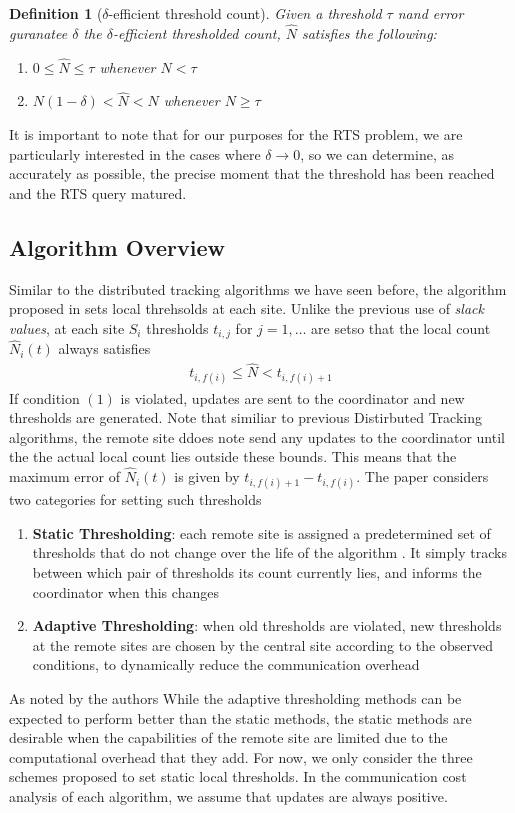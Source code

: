 \documentclass{article}
\newtheorem{definition}{Definition}
\begin{document}
\begin{definition}[$\delta$-efficient threshold count]
Given a threshold $\tau$ nand error guranatee $\delta$ the $\delta$-efficient thresholded count, $\hat{N}$ satisfies the following: 
\begin{enumerate}
    \item $0\leq \hat{N}\leq \tau$ whenever $N < \tau$
    \item $N(1-\delta) < \hat{N} < N$ whenever $N \geq \tau$
\end{enumerate}
\end{definition}
It is important to note that for our purposes for the RTS problem, we are particularly interested in the cases where $\delta\rightarrow0$, so we can determine, as accurately as possible, the precise moment that the threshold has been reached and the RTS query matured.

\subsection*{Algorithm Overview}
Similar to the distributed tracking algorithms we have seen before, the algorithm proposed in \cite{10.1145/1142473.1142507} sets local threhsolds at each site. Unlike the previous use of \textit{slack values}, at each site $S_i$ thresholds $t_{i,j}$ for $j=1,\dots$ are setso that the local count $\hat{N}_i(t)$ always satisfies
\begin{align}
    t_{i,f(i)} \leq \hat{N} < t_{i,f(i)+1}
\end{align}
If condition $(1)$ is violated, updates are sent to the coordinator and new thresholds are generated. Note that similiar to previous Distirbuted Tracking algorithms, the remote site ddoes note send any updates to the coordinator until the the actual local count lies outside these bounds. This means that the maximum error of $\hat{N}_i(t)$ is given by $t_{i,f(i)+1} - t_{i,f(i)}$. The paper considers two categories for setting such thresholds 
\begin{enumerate}
    \item \textbf{Static Thresholding}: each remote site is assigned a predetermined set of thresholds that do not change over the life of the algorithm . It simply tracks between which pair of thresholds its count currently lies, and informs the coordinator when this
changes
    \item \textbf{Adaptive Thresholding}: when old thresholds are violated, new thresholds at the remote sites are chosen by the central site according to the observed conditions, to dynamically reduce the communication overhead
\end{enumerate}
As noted by the authors While the adaptive thresholding methods can be expected to perform better than the static methods, the static methods are desirable when the capabilities of the remote site are limited due to the computational overhead that they add. For now, we only consider the three schemes proposed to set static local thresholds. In the communication cost analysis of each algorithm, we assume that updates are always positive.
\end{document}
